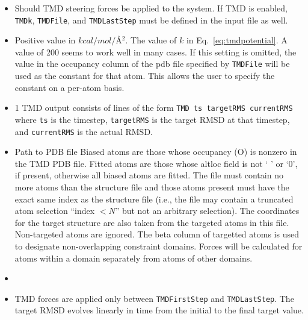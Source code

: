 \begin{itemize}
\item
{}
{Should TMD steering forces be applied to the system.  If TMD is enabled,
{\tt TMDk}, {\tt TMDFile}, and {\tt TMDLastStep} must be defined in the 
input file as well.}

\item
{}
{Positive value in $kcal/mol/$\AA$^2$.}
{The value of $k$ in Eq.~\ref{eq:tmdpotential}.  A value of 200 seems to work
well in many cases.  If this setting is omitted, the value in the occupancy column
of the pdb file specified by {\tt TMDFile} will be used as the constant for that atom.  
This allows the user to specify the constant on a per-atom basis.}

\item
{}
{1} 
{ TMD output consists of lines of the form {\tt TMD  ts  targetRMS  currentRMS}
where {\tt ts} is the timestep, {\tt targetRMS} is the target RMSD at that 
timestep, and {\tt currentRMS} is the actual RMSD.}

\item
{}
{Path to PDB file}
{
Biased atoms are those whose occupancy (O) is nonzero in the TMD PDB file.
Fitted atoms are those whose altloc field is not ` ' or `0', if present,
otherwise all biased atoms are fitted.
The file must contain no more atoms than the structure file and those atoms
present must have the exact same index as the structure file (i.e., the file
may contain a truncated atom selection ``index $< N$'' but not an arbitrary selection).
The coordinates for the target structure are also taken from the targeted
atoms in this file.  Non-targeted atoms are ignored.  The beta column of targetted
atoms is used to designate non-overlapping constraint domains.  Forces will be
calculated for atoms within a domain separately from atoms of other domains.
}

\item
{} {}
\item
{}
{ TMD forces are applied only between {\tt TMDFirstStep} and {\tt TMDLastStep}.
The target RMSD evolves linearly in time from the initial to the final target 
value.  }


\end{itemize}
